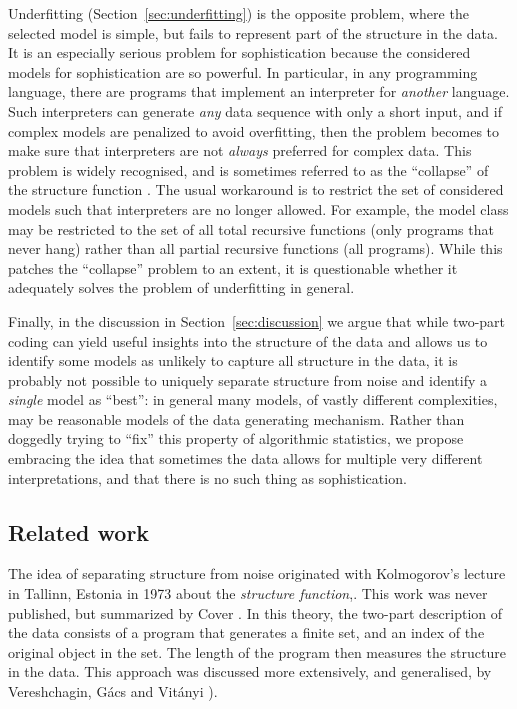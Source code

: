 \documentclass{style/llncs}
\begin{document}
Underfitting (Section~\ref{sec:underfitting}) is the opposite problem, where the selected model is simple, but fails to represent part of the structure in the data. It is an especially serious problem for sophistication because the considered models for sophistication are so powerful. In particular, in any programming language, there are programs that implement an interpreter for \emph{another} language. Such interpreters can generate \emph{any} data sequence with only a short input, and if complex models are penalized to avoid overfitting, then the problem becomes to make sure that interpreters are not \emph{always} preferred for complex data. This problem is widely recognised, and is sometimes referred to as the ``collapse'' of the structure function \cite{}. The usual workaround is to restrict the set of considered models such that interpreters are no longer allowed. For example, the model class may be restricted to the set of all total recursive functions (only programs that never hang) rather than all partial recursive functions (all programs). While this patches the ``collapse'' problem to an extent, it is questionable whether it adequately solves the problem of underfitting in general.

Finally, in the discussion in Section~\ref{sec:discussion} we argue that while two-part coding can yield useful insights into the structure of the data and allows us to identify some models as unlikely to capture all structure in the data, it is probably not possible to uniquely separate structure from noise and identify a \emph{single} model as ``best'': in general many models, of vastly different complexities, may be reasonable models of the data generating mechanism. Rather than doggedly trying to ``fix'' this property of algorithmic statistics, we propose embracing the idea that sometimes the data allows for multiple very different interpretations, and that there is no such thing as sophistication.

\subsection{Related work}
The idea of separating structure from noise originated with Kolmogorov's lecture in Tallinn, Estonia in 1973 about the \emph{structure function},. This work was never published, but summarized by Cover \cite{cover1985kolmogorov}.  In this theory, the two-part description of the data consists of a program that generates a finite set, and an index of the original object in the set. The length of the program then measures the structure in the data. This approach was discussed more extensively, and generalised, by Vereshchagin, G\'acs and Vit\'anyi \cite{vereshchagin2004kolmogorov,gacs2001algorithmic}). 
\end{document}
